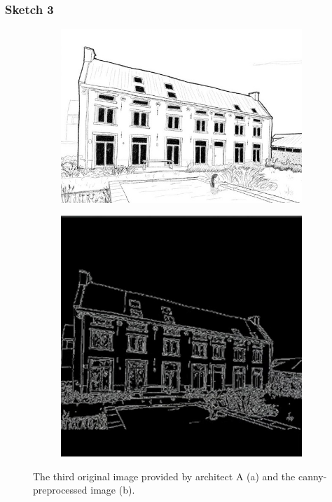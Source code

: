 \subsubsection{Sketch 3}
\begin{figure}[H]
    \centering
    \begin{subfigure}[b]{0.3\textwidth}
        \centering
        \includegraphics[width=\textwidth]{Images/Results/Architect-A_unstructured-phase/sketches/sketch_3.jpeg}
        \caption{}
        \label{A-unstructured-3-sketch}
    \end{subfigure}
    \begin{subfigure}[b]{0.3\textwidth}
        \centering 
        \includegraphics[width=\textwidth]{Images/Results/Architect-A_unstructured-phase/sketches/sketch_3_preprocessed.jpg}
        \caption{}
        \label{A-unstructured-3-sketch-prep}
    \end{subfigure}
    \caption{The third original image provided by architect A (a) and the canny-preprocessed image (b).}
    \label{fig:placeholder}
\end{figure}
